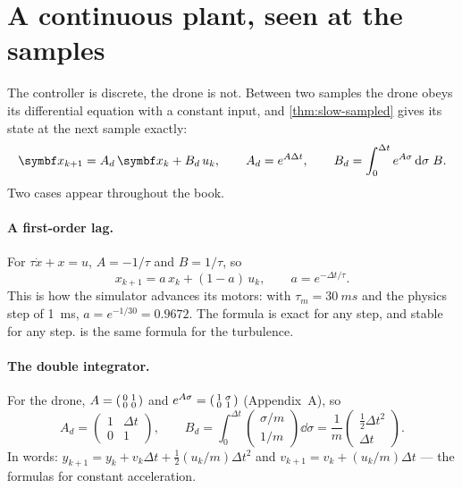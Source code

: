 \section{A continuous plant, seen at the samples}

The controller is discrete, the drone is not. Between two samples the drone obeys its differential equation with a constant input, and \cref{thm:slow-sampled} gives its state at the next sample exactly:
\begin{equation}\label{eq:D-zoh}
  \vx_{k+1} = A_d\,\vx_k + B_d\,u_k, \qquad A_d = e^{A\Delta t}, \qquad B_d = \int_0^{\Delta t} e^{A\sigma}\,\dd\sigma\;B .
\end{equation}
Two cases appear throughout the book.

\paragraph{A first-order lag.} For $\tau\dot x + x = u$, $A = -1/\tau$ and $B = 1/\tau$, so
\begin{equation}\label{eq:D-lag}
  x_{k+1} = a\,x_k + (1 - a)\,u_k, \qquad a = e^{-\Delta t/\tau} .
\end{equation}
This is how the simulator advances its motors: with $\tau_m = \SI{30}{ms}$ and the physics step of \SI{1}{ms}, $a = e^{-1/30} = 0.9672$. The formula is exact for any step, and stable for any step.  is the same formula for the turbulence.

\paragraph{The double integrator.} For the drone, $A = \begin{psmallmatrix}0 & 1\\ 0 & 0\end{psmallmatrix}$ and $e^{A\sigma} = \begin{psmallmatrix}1 & \sigma\\ 0 & 1\end{psmallmatrix}$ (Appendix~A), so
\begin{equation}\label{eq:D-di}
  A_d = \begin{pmatrix}1 & \Delta t\\ 0 & 1\end{pmatrix}, \qquad
  B_d = \int_0^{\Delta t}\begin{pmatrix}\sigma/m\\ 1/m\end{pmatrix}\dd\sigma = \frac1m\begin{pmatrix}\tfrac12\Delta t^2\\ \Delta t\end{pmatrix} .
\end{equation}
In words: $y_{k+1} = y_k + v_k\Delta t + \tfrac12(u_k/m)\Delta t^2$ and $v_{k+1} = v_k + (u_k/m)\Delta t$ — the formulas for constant acceleration.

